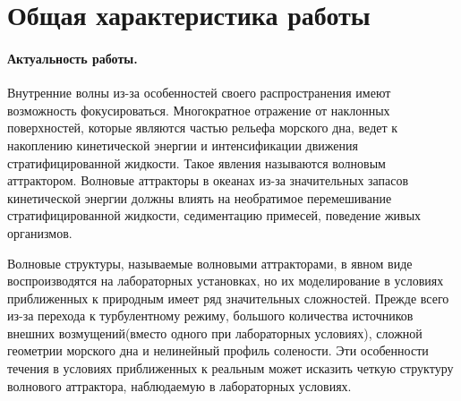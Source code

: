 \documentclass[utf8x]{G7-32} %
\begin{document}
\setcounter{page}{3}
\pagestyle{fancy}
\setcounter{secnumdepth}{-1}

\section{Общая характеристика работы}


\paragraph{Актуальность работы.}

Внутренние волны из-за особенностей своего распространения имеют возможность фокусироваться. Многократное отражение от наклонных поверхностей, которые являются частью рельефа морского дна, ведет к накоплению кинетической энергии и интенсификации движения стратифицированной жидкости. Такое явления называются волновым аттрактором. Волновые аттракторы в океанах из-за значительных запасов кинетической энергии должны влиять на необратимое перемешивание стратифицированной жидкости, седиментацию примесей, поведение живых организмов. 

Волновые структуры, называемые волновыми аттракторами, в явном виде воспроизводятся на лабораторных установках, но их моделирование в условиях приближенных к природным имеет ряд значительных сложностей. Прежде всего из-за перехода к турбулентному режиму, большого количества источников внешних возмущений(вместо одного при лабораторных условиях), сложной геометрии морского дна и нелинейный профиль солености. Эти особенности течения в условиях приближенных к реальным может исказить четкую структуру волнового аттрактора, наблюдаемую в лабораторных условиях. 
\end{document}
